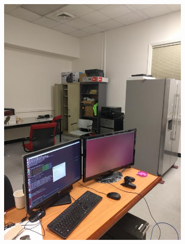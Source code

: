 \documentclass[12pt]{article}
\begin{document}
\begin{figure}[t!]
\begin{subfigure}[t]{0.1\textwidth}
        \includegraphics[width=\linewidth]{../Images/Set3/2}
    \end{subfigure}
    \begin{subfigure}[t]{0.1\textwidth}
        \centering

\end{subfigure}
\end{figure}
\end{document}
